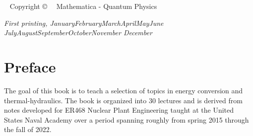 \documentclass{tufte-book}
\newcommand{\monthyear}{%
  \ifcase\month\or January\or February\or March\or April\or May\or June\or
  July\or August\or September\or October\or November\or
  December\fi\space\number\year
}
\begin{document}
\maketitle


\newpage
\begin{fullwidth}
~\vfill
\thispagestyle{empty}
\setlength{\parindent}{0pt}
\setlength{\parskip}{\baselineskip}
Copyright \copyright\ \the\year\ \thanklessauthor
Mathematica - Quantum Physics
\par{}

%

\par\textit{First printing, \monthyear}
\end{fullwidth}

\tableofcontents

\listoffigures

\listoftables



\cleardoublepage
\chapter*{Preface}

The goal of this book is to teach a selection of topics in energy conversion and thermal-hydraulics.  The book is organized into 30 lectures and is derived from notes developed for ER468 Nuclear Plant Engineering taught at the United States Naval Academy over a period spanning roughly from spring 2015 through the fall of 2022.
\end{document}
